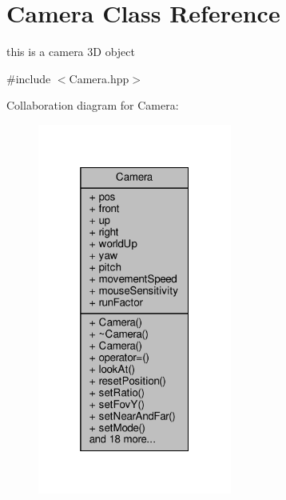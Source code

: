 \hypertarget{class_camera}{}\section{Camera Class Reference}
\label{class_camera}


this is a camera 3D object  




{\ttfamily \#include $<$Camera.\+hpp$>$}



Collaboration diagram for Camera\+:
\nopagebreak
\begin{figure}[H]
\begin{center}
\leavevmode
\includegraphics[width=181pt]{class_camera__coll__graph}
\end{center}
\end{figure}
